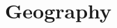 \documentclass[../my_knowledge.tex]{subfiles}
\begin{document}
\chapter{Geography}

\newpage
\minitoc
\newpage



\end{document}
